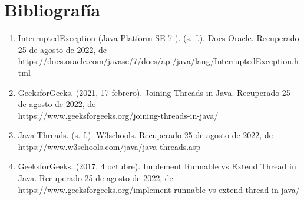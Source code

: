 \documentclass{article}
\begin{document}
    \section*{Bibliografía}
    \Large 
    \begin{enumerate}
        \item InterruptedException (Java Platform SE 7 ). (s. f.). Docs Oracle. Recuperado 25 de agosto de 2022, de\\ https://docs.oracle.com/javase/7/docs/api/java/lang/InterruptedException.html
        \item GeeksforGeeks. (2021, 17 febrero). Joining Threads in Java. Recuperado 25 de agosto de 2022, de\\ https://www.geeksforgeeks.org/joining-threads-in-java/
        \item Java Threads. (s. f.). W3schools. Recuperado 25 de agosto de 2022, de\\ https://www.w3schools.com/java/java$\_$threads.asp
        \item GeeksforGeeks. (2017, 4 octubre). Implement Runnable vs Extend Thread in Java. Recuperado 25 de agosto de 2022, de\\ https://www.geeksforgeeks.org/implement-runnable-vs-extend-thread-in-java/
    \end{enumerate}
    
\end{document}
